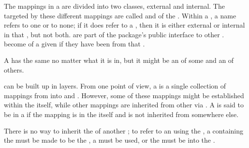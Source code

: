 \endsubsubsection%



The mappings in a  are divided into two classes, external and internal.
The  targeted by these different mappings 
are called  and  of the
. Within a , a name refers to one
 or to none; if it does refer
to a , then it is either external or internal in that
, but not both.
 are part of the package's public interface to other
.   become  of a given
 if they have been  from that .

A  has the same  no matter what  
it is  in, but it might be an  of some 
and an  of others. 

\endsubsubsubsection%


 can be built up in layers.  From one point of view,
a  is a single collection
of mappings from  into  and 
.
However, some of these mappings might be established within the  
itself, while other mappings are inherited from other  
via .
A  is said to be  in a  
if the mapping is in the  itself and is
not inherited from somewhere else.

There is no way to inherit the  of another ;
to refer to an  using the , 
    a  containing the  
     must be made to be the ,
    a  must be used,
 or the  must be  into the .

\endsubsubsubsection%


